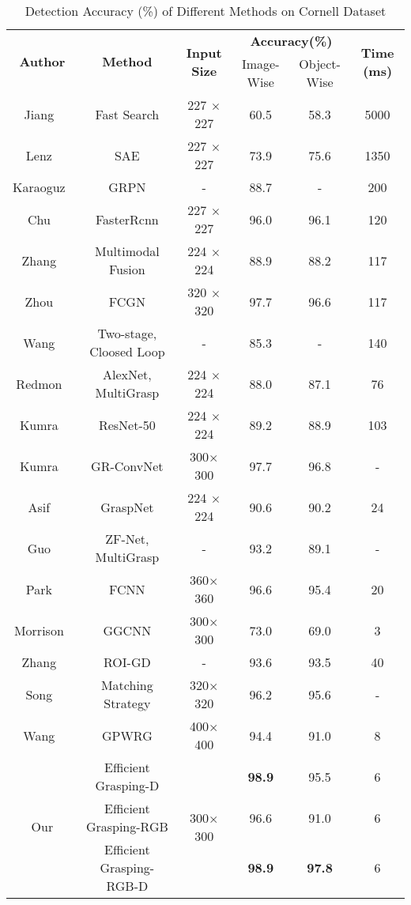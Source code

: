 \documentclass[journal]{IEEEtran}
\begin{document}
\begin{table*}[htbp]
	\caption{Detection Accuracy (\%) of Different Methods on Cornell Dataset}
	\begin{center}
		\begin{tabular}{c|c|c|c|c|c}
			\hline
			\multirow{2}{*}{\textbf{Author}} &\multirow{2}{*}{\textbf{Method}}&\multirow{2}{*}{\textbf{Input Size}} &\multicolumn{2}{c|}{\textbf{Accuracy(\%)}}&\multirow{2}{*}{\textbf{Time (ms)}}\\
			\cline{4-5}
			& & &Image-Wise & Object-Wise&\\
			\hline
			Jiang~\cite{jiang}& Fast Search & 227 $\times$ 227 &60.5 & 58.3& 5000\\
			Lenz~\cite{lenz}& SAE & 227 $\times$ 227 & 73.9 & 75.6& 1350\\
			Karaoguz~\cite{kara}& GRPN& - &  88.7 & - & 200\\
			Chu~\cite{chu}& FasterRcnn& 227 $\times$ 227 &  96.0 & 96.1& 120\\
			Zhang~\cite{robust}& Multimodal Fusion& 224 $\times$ 224 &  88.9 & 88.2& 117\\
			Zhou~\cite{zhou}& FCGN & 320 $\times$ 320 &  97.7 & 96.6& 117\\
			Wang~\cite{wang_2}& Two-stage, Cloosed Loop& - &  85.3 & -& 140\\
			Redmon~\cite{Redmon}& AlexNet, MultiGrasp& 224 $\times$ 224 &  88.0 & 87.1& 76\\
			Kumra~\cite{kumra1}& ResNet-50 & 224 $\times$ 224 &  89.2 & 88.9& 103\\
			Kumra~\cite{kumra}& GR-ConvNet & 300$ \times$ 300 &  97.7 & 96.8& -\\
			Asif~\cite{asif}& GraspNet& 224 $\times$ 224 &  90.6 & 90.2& 24\\
		    Guo~\cite{guo}& ZF-Net, MultiGrasp& - &  93.2 & 89.1& -\\
		    Park~\cite{DBLP}& FCNN & 360$ \times$ 360 &  96.6 & 95.4& 20\\
		    Morrison~\cite{ggcnn}& GGCNN & 300$ \times$ 300 &  73.0 & 69.0& 3\\
		    Zhang~\cite{roi}& ROI-GD & - &  93.6 & 93.5& 40\\
		    Song~\cite{ggcnn}& Matching Strategy & 320$ \times$ 320 &  96.2 & 95.6& -\\
		    Wang~\cite{25_wang}& GPWRG & 400$ \times$ 400 &  94.4 & 91.0& 8\\
			\hline
			\multirow{3}{*}{Our}& Efficient Grasping-D & \multirow{3}{*}{300$ \times$ 300} &  \textbf{98.9} & 95.5& 6\\
			& Efficient Grasping-RGB &  &  96.6 & 91.0& 6\\
			& Efficient Grasping-RGB-D &  & \textbf{98.9} & \textbf{97.8}& 6\\
			\hline
		\end{tabular}
	\end{center}
	\label{tab:detectioncornell}
\end{table*}
\end{document}
